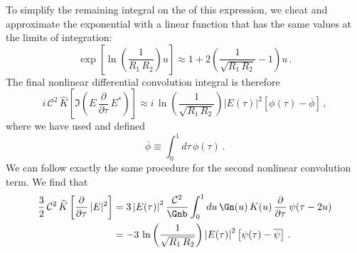 To simplify the remaining integral on the \rhs of this expression, we cheat and approximate the exponential with a linear function that has the same values at the limits of integration:
\begin{equation}
    \exp\left[\ln\left(\frac{1}{R_1\, R_2}\right) u\right] \approx 1 + 2 \left(\frac{1}{\sqrt{R_1\, R_2}} - 1\right) u\, .
\end{equation}
The final nonlinear differential convolution integral is therefore
\begin{equation}
    i\, \mathcal{C}^2\, \widehat{K}\left[\Im\left(E\,\frac{\partial}{\partial \tau}\, E^\ast\right)\right] \approx i\, \ln\left(\frac{1}{\sqrt{R_1\, R_2}}\right) \left|E(\tau)\right|^2 \left[\phi(\tau) - \overline{\phi}\right]\, ,
\end{equation}
where we have used  and defined
\begin{equation}
    \overline{\phi} \equiv \int_{0}^{1} d \tau\, \phi(\tau)\, .
\end{equation}
We can follow exactly the same procedure for the second nonlinear convolution term. We find that
\begin{equation}
    \begin{split}
        \frac{3}{2}\, \mathcal{C}^2\, \widehat{K}\left[\frac{\partial}{\partial \tau}\, |E|^2\right] &= 3 \left|E(\tau)\right|^2 \frac{\mathcal{C}^2}{\Gnb} \int_{0}^{1} d u\, \Gn(u)\, K(u)\, \frac{\partial}{\partial \tau}\, \psi(\tau - 2 u) \\
        &= - 3\, \ln\left(\frac{1}{\sqrt{R_1\, R_2}}\right) \left|E(\tau)\right|^2 \left[\psi(\tau) - \overline{\psi}\right]\, .
    \end{split}
\end{equation}

